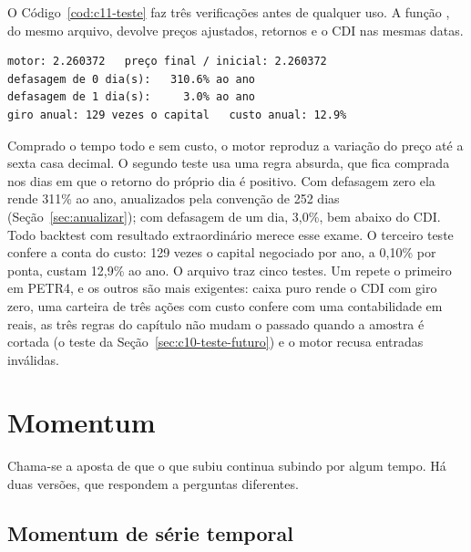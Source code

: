 O Código~\ref{cod:c11-teste} faz três verificações antes de qualquer uso. A função , do mesmo arquivo, devolve preços ajustados, retornos e o CDI nas mesmas datas.


\begin{lstlisting}[style=saida]
motor: 2.260372   preço final / inicial: 2.260372
defasagem de 0 dia(s):   310.6% ao ano
defasagem de 1 dia(s):     3.0% ao ano
giro anual: 129 vezes o capital   custo anual: 12.9%
\end{lstlisting}

Comprado o tempo todo e sem custo, o motor reproduz a variação do preço até a sexta casa decimal. O segundo teste usa uma regra absurda, que fica comprada nos dias em que o retorno do próprio dia é positivo. Com defasagem zero ela rende 311\% ao ano, anualizados pela convenção de 252 dias (Seção~\ref{sec:anualizar}); com defasagem de um dia, 3,0\%, bem abaixo do CDI. Todo backtest com resultado extraordinário merece esse exame. O terceiro teste confere a conta do custo: 129 vezes o capital negociado por ano, a 0,10\% por ponta, custam 12,9\% ao ano. O arquivo  traz cinco testes. Um repete o primeiro em PETR4, e os outros são mais exigentes: caixa puro rende o CDI com giro zero, uma carteira de três ações com custo confere com uma contabilidade em reais, as três regras do capítulo não mudam o passado quando a amostra é cortada (o teste da Seção~\ref{sec:c10-teste-futuro}) e o motor recusa entradas inválidas.

\section{Momentum}
\label{sec:c11-momentum}

Chama-se  a aposta de que o que subiu continua subindo por algum tempo. Há duas versões, que respondem a perguntas diferentes.

\subsection{Momentum de série temporal}

